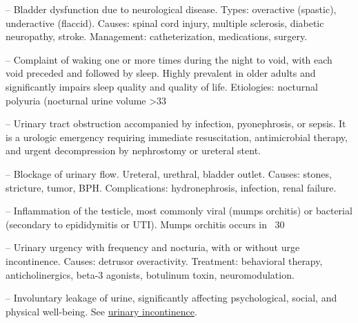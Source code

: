 -- Bladder dysfunction due to neurological disease. Types: overactive (spastic), underactive (flaccid). Causes: spinal cord injury, multiple sclerosis, diabetic neuropathy, stroke. Management: catheterization, medications, surgery.

-- Complaint of waking one or more times during the night to void, with each void preceded and followed by sleep. Highly prevalent in older adults and significantly impairs sleep quality and quality of life. Etiologies: nocturnal polyuria (nocturnal urine volume >33%

-- Urinary tract obstruction accompanied by infection, pyonephrosis, or sepsis. It is a urologic emergency requiring immediate resuscitation, antimicrobial therapy, and urgent decompression by nephrostomy or ureteral stent.

-- Blockage of urinary flow. Ureteral, urethral, bladder outlet. Causes: stones, stricture, tumor, BPH. Complications: hydronephrosis, infection, renal failure.

-- Inflammation of the testicle, most commonly viral (mumps orchitis) or bacterial (secondary to epididymitis or UTI). Mumps orchitis occurs in ~30%

-- Urinary urgency with frequency and nocturia, with or without urge incontinence. Causes: detrusor overactivity. Treatment: behavioral therapy, anticholinergics, beta-3 agonists, botulinum toxin, neuromodulation.

-- Involuntary leakage of urine, significantly affecting psychological, social, and physical well-being. See \hyperlink{Urinary Incontinence}{urinary incontinence}.

